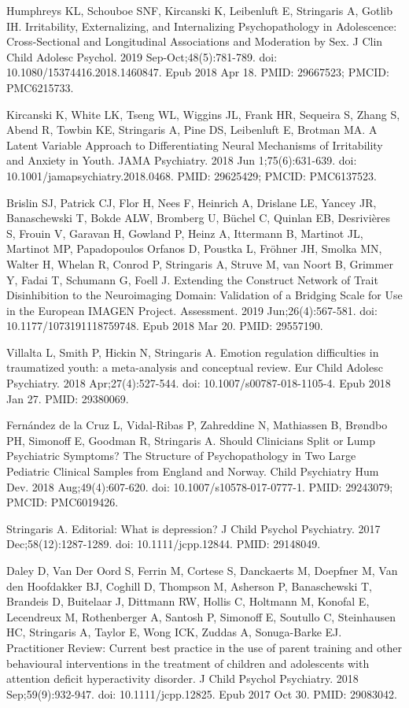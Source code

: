 \documentclass[
]{article}
\begin{document}
Humphreys KL, Schouboe SNF, Kircanski K, Leibenluft E, Stringaris A,
Gotlib IH. Irritability, Externalizing, and Internalizing
Psychopathology in Adolescence: Cross-Sectional and Longitudinal
Associations and Moderation by Sex. J Clin Child Adolesc Psychol. 2019
Sep-Oct;48(5):781-789. doi: 10.1080/15374416.2018.1460847. Epub 2018 Apr
18. PMID: 29667523; PMCID: PMC6215733.

Kircanski K, White LK, Tseng WL, Wiggins JL, Frank HR, Sequeira S, Zhang
S, Abend R, Towbin KE, Stringaris A, Pine DS, Leibenluft E, Brotman MA.
A Latent Variable Approach to Differentiating Neural Mechanisms of
Irritability and Anxiety in Youth. JAMA Psychiatry. 2018 Jun
1;75(6):631-639. doi: 10.1001/jamapsychiatry.2018.0468. PMID: 29625429;
PMCID: PMC6137523.

Brislin SJ, Patrick CJ, Flor H, Nees F, Heinrich A, Drislane LE, Yancey
JR, Banaschewski T, Bokde ALW, Bromberg U, Büchel C, Quinlan EB,
Desrivières S, Frouin V, Garavan H, Gowland P, Heinz A, Ittermann B,
Martinot JL, Martinot MP, Papadopoulos Orfanos D, Poustka L, Fröhner JH,
Smolka MN, Walter H, Whelan R, Conrod P, Stringaris A, Struve M, van
Noort B, Grimmer Y, Fadai T, Schumann G, Foell J. Extending the
Construct Network of Trait Disinhibition to the Neuroimaging Domain:
Validation of a Bridging Scale for Use in the European IMAGEN Project.
Assessment. 2019 Jun;26(4):567-581. doi: 10.1177/1073191118759748. Epub
2018 Mar 20. PMID: 29557190.

Villalta L, Smith P, Hickin N, Stringaris A. Emotion regulation
difficulties in traumatized youth: a meta-analysis and conceptual
review. Eur Child Adolesc Psychiatry. 2018 Apr;27(4):527-544. doi:
10.1007/s00787-018-1105-4. Epub 2018 Jan 27. PMID: 29380069.

Fernández de la Cruz L, Vidal-Ribas P, Zahreddine N, Mathiassen B,
Brøndbo PH, Simonoff E, Goodman R, Stringaris A. Should Clinicians Split
or Lump Psychiatric Symptoms? The Structure of Psychopathology in Two
Large Pediatric Clinical Samples from England and Norway. Child
Psychiatry Hum Dev. 2018 Aug;49(4):607-620. doi:
10.1007/s10578-017-0777-1. PMID: 29243079; PMCID: PMC6019426.

Stringaris A. Editorial: What is depression? J Child Psychol Psychiatry.
2017 Dec;58(12):1287-1289. doi: 10.1111/jcpp.12844. PMID: 29148049.

Daley D, Van Der Oord S, Ferrin M, Cortese S, Danckaerts M, Doepfner M,
Van den Hoofdakker BJ, Coghill D, Thompson M, Asherson P, Banaschewski
T, Brandeis D, Buitelaar J, Dittmann RW, Hollis C, Holtmann M, Konofal
E, Lecendreux M, Rothenberger A, Santosh P, Simonoff E, Soutullo C,
Steinhausen HC, Stringaris A, Taylor E, Wong ICK, Zuddas A, Sonuga-Barke
EJ. Practitioner Review: Current best practice in the use of parent
training and other behavioural interventions in the treatment of
children and adolescents with attention deficit hyperactivity disorder.
J Child Psychol Psychiatry. 2018 Sep;59(9):932-947. doi:
10.1111/jcpp.12825. Epub 2017 Oct 30. PMID: 29083042.
\end{document}
